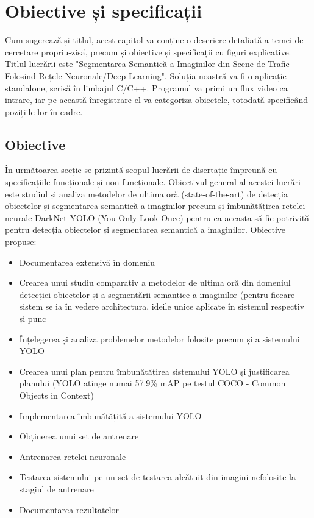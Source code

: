\chapter{Obiective și specificații}
\label{cap:obiective-specificatii}
Cum sugerează și titlul, acest capitol va conține o descriere detaliată a temei de cercetare propriu-zisă, precum și obiective și specificații cu figuri explicative. Titlul lucrării este "Segmentarea Semantică a Imaginilor din Scene de Trafic Folosind Rețele Neuronale/Deep Learning".\newline
Soluția noastră va fi o aplicație standalone, scrisă în limbajul C/C++. Programul va primi un flux video ca intrare, iar pe această înregistrare el va categoriza obiectele, totodată specificând pozițiile lor în cadre.

\section{Obiective}
În următoarea secție se prizintă scopul lucrării de disertație împreună cu specificațiile funcționale și non-funcționale.\newline
Obiectivul general al acestei lucrări este studiul și analiza metodelor de ultima oră (state-of-the-art) de detecția obiectelor și segmentarea semantică a imaginilor precum și îmbunătățirea rețelei neurale DarkNet YOLO  \cite{DBLP:journals/corr/abs-1804-02767} (You Only Look Once)  pentru ca aceasta să fie potrivită pentru detecția obiectelor și segmentarea semantică a imaginilor. Obiective propuse:
\begin{itemize}
	\item Documentarea extensivă în domeniu
	\item Crearea unui studiu comparativ a metodelor de ultima oră din domeniul detecției obiectelor și a segmentării semantice a imaginilor (pentru fiecare sistem se ia în vedere architectura, ideile unice aplicate în sistemul respectiv și punc
	\item Înțelegerea și analiza problemelor metodelor folosite precum și a sistemului YOLO
	\item Crearea unui plan pentru îmbunătățirea sistemului YOLO și justificarea planului (YOLO atinge numai 57.9\% mAP pe testul COCO - Common Objects in Context)
	\item Implementarea îmbunătățită a sistemului YOLO
	\item Obținerea unui set de antrenare
	\item Antrenarea rețelei neuronale
	\item Testarea sistemului pe un set de testarea alcătuit din imagini nefolosite la stagiul de antrenare
	\item Documentarea rezultatelor
\end{itemize}

